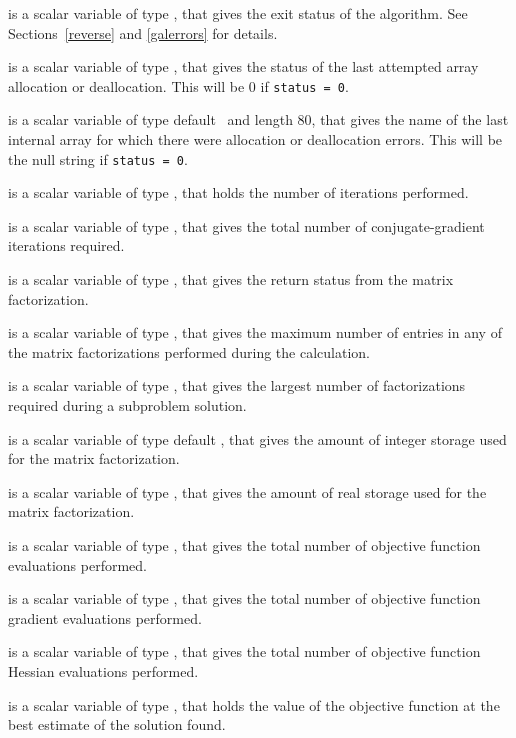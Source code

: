 \documentclass{galahad}
\begin{document}
\begin{description}
 is a scalar variable of type \integer, that gives the
exit status of the algorithm.
See Sections~\ref{reverse} and \ref{galerrors}
for details.

 is a scalar variable of type \integer, that gives
the status of the last attempted array allocation or deallocation.
This will be 0 if {\tt status = 0}.

 is a scalar variable of type default \character\
and length 80, that  gives the name of the last internal array
for which there were allocation or deallocation errors.
This will be the null string if {\tt status = 0}.

 is a scalar variable of type \integer, that holds the
number of iterations performed.

 is a scalar variable of type \integer, that gives the
total number of conjugate-gradient iterations required.

 is a scalar variable of type \integer, that
gives the return status from the matrix factorization.

 is a scalar variable of type \longinteger, that
gives the maximum number of entries in any of the matrix factorizations
performed during the calculation.

 is a scalar variable of type \integer, that
gives the largest number of factorizations required during a subproblem
solution.

 is a scalar variable of type default
\integer, that gives the amount of integer storage used for the matrix
factorization.

 is a scalar variable of type \integer,
that gives the amount of real storage used for the matrix factorization.

 is a scalar variable of type \integer, that gives the
total number of objective function evaluations performed.

 is a scalar variable of type \integer, that gives the
total number of objective function gradient evaluations performed.

 is a scalar variable of type \integer, that gives the
total number of objective function Hessian evaluations performed.

 is a scalar variable of type \realdp, that holds the
value of the objective function at the best estimate of the solution found.


\end{description}
\end{document}
